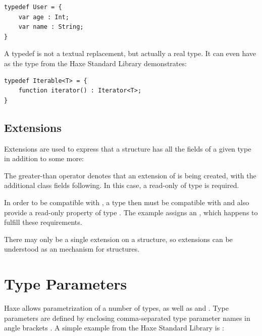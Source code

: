 \documentclass{haxe}
\begin{document}
\begin{lstlisting}
typedef User = {
    var age : Int;
    var name : String;
}
\end{lstlisting}
A typedef is not a textual replacement, but actually a real type. It can even have  as the  type from the Haxe Standard Library demonstrates:

\begin{lstlisting}
typedef Iterable<T> = {
	function iterator() : Iterator<T>;
}
\end{lstlisting}



\subsection{Extensions}
\label{type-system-extensions}

Extensions are used to express that a structure has all the fields of a given type in addition to some more:

The greater-than operator \expr{>} denotes that an extension of  is being created, with the additional class fields following. In this case, a read-only   of type  is required.

In order to be compatible with , a type then must be compatible with  and also provide a read-only  property of type . The example assigns an , which happens to fulfill these requirements.

There may only be a single extension on a structure, so extensions can be understood as an  mechanism for structures.




\section{Type Parameters}
\label{type-system-type-parameters}

Haxe allows parametrization of a number of types, as well as  and . Type parameters are defined by enclosing comma-separated type parameter names in angle brackets \expr{$<>$}. A simple example from the Haxe Standard Library is :
\end{document}
